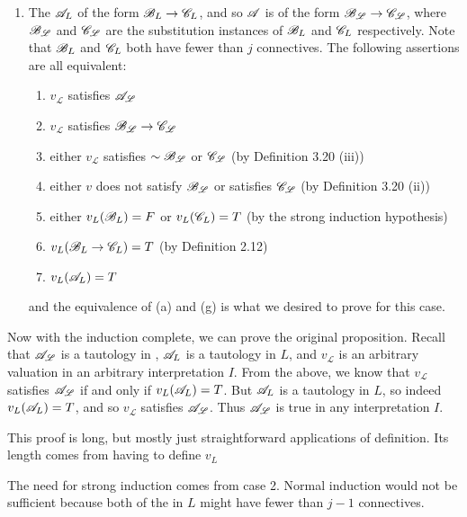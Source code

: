 \begin{proposition}
\begin{enumerate}
    \item The \wf{} \(\mathscr{A}_L\) of the form \(\mathscr{B}_L \rightarrow \mathscr{C}_L\), and so \(\mathscr{A}\) is of the form \(\mathscr{B}_{\mathscr{L}} \rightarrow \mathscr{C}_{\mathscr{L}}\), where \(\mathscr{B}_{\mathscr{L}}\) and \(\mathscr{C}_{\mathscr{L}}\) are the substitution instances of \(\mathscr{B}_L\) and \(\mathscr{C}_L\) respectively. Note that \(\mathscr{B}_L\) and \(\mathscr{C}_L\) both have fewer than \(j\) connectives. The following assertions are all equivalent:
      \begin{enumerate}[align=left]
        \item \(v_{\mathscr{L}}\) satisfies \(\mathscr{A}_{\mathscr{L}}\)
        \item \(v_{\mathscr{L}}\) satisfies \(\mathscr{B}_{\mathscr{L}} \rightarrow \mathscr{C}_{\mathscr{L}}\)
        \item either \(v_{\mathscr{L}}\) satisfies \(\sim\mathscr{B}_{\mathscr{L}}\) or \(\mathscr{C}_{\mathscr{L}}\) (by Definition 3.20 (iii))
        \item either \(v\) does not satisfy \(\mathscr{B}_{\mathscr{L}}\) or satisfies \(\mathscr{C}_{\mathscr{L}}\) (by Definition 3.20 (ii))
        \item either \(v_L(\mathscr{B}_L) = F\) or \(v_L(\mathscr{C}_L) = T\) (by the strong induction hypothesis)
        \item \(v_L(\mathscr{B}_L \rightarrow \mathscr{C}_L) = T\) (by Definition 2.12)
        \item \(v_L(\mathscr{A}_L) = T\)
      \end{enumerate}
      and the equivalence of (a) and (g) is what we desired to prove for this case.
  \end{enumerate}

  Now with the induction complete, we can prove the original proposition. Recall that \(\mathscr{A}_{\mathscr{L}}\) is a tautology in \cl{}, \(\mathscr{A}_L\) is a tautology in \(L\), and \(v_{\mathscr{L}}\) is an arbitrary valuation in an arbitrary interpretation \(I\). From the above, we know that \(v_{\mathscr{L}}\) satisfies \(\mathscr{A}_{\mathscr{L}}\) if and only if \(v_L(\mathscr{A}_L) = T\). But \(\mathscr{A}_L\) is a tautology in \(L\), so indeed \(v_L(\mathscr{A}_L) = T\), and so \(v_{\mathscr{L}}\) satisfies \(\mathscr{A}_{\mathscr{L}}\). Thus \(\mathscr{A}_{\mathscr{L}}\) is true in any interpretation \(I\).

  \note{} This proof is long, but mostly just straightforward applications of definition. Its length comes from having to define \(v_L\) 

  \note{} The need for strong induction comes from case 2. Normal induction would not be sufficient because both of the \wfs{} in \(L\) might have fewer than \(j - 1\) connectives.
\end{proposition}

